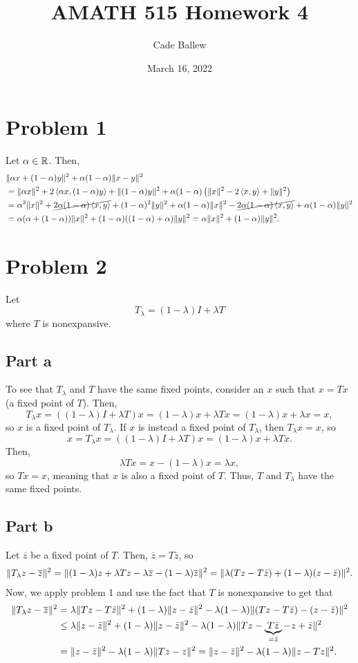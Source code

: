 \documentclass{article}
\title{AMATH 515 Homework 4}
\author{Cade Ballew}
\date{March 16, 2022}
\begin{document}
	
\maketitle
	
\section{Problem 1}
Let $\alpha\in\mathbb{R}$. Then,
\begin{align*}
&\|\alpha x + (1-\alpha) y\|^2 + \alpha(1-\alpha) \|x-y\|^2\\&=
\|\alpha x\|^2+2\left \langle \alpha x , (1-\alpha) y \right \rangle+\|(1-\alpha) y\|^2+ \alpha(1-\alpha)\left(\|x\|^2-2\left \langle x , y \right \rangle+\|y\|^2\right)\\&=
\alpha^2\|x\|^2+\cancel{2\alpha(1-\alpha)\left \langle x ,  y \right \rangle}+(1-\alpha)^2\| y\|^2+ \alpha(1-\alpha)\|x\|^2-\cancel{2\alpha(1-\alpha)\left \langle x , y \right \rangle}+\alpha(1-\alpha)\|y\|^2\\&=
\alpha(\alpha+(1-\alpha))\|x\|^2+(1-\alpha)((1-\alpha)+\alpha)\|y\|^2=\alpha \|x\|^2 + (1-\alpha) \|y\|^2.
\end{align*}

\section{Problem 2}
Let 
\[
T_\lambda = (1-\lambda)I + \lambda T
\]
where $T$ is nonexpansive. 
\subsection{Part a}
To see that $T_\lambda$ and $T$ have the same fixed points, consider an $x$ such that $x=Tx$ (a fixed point of $T$). Then,
\[
T_\lambda x=((1-\lambda)I + \lambda T)x=(1-\lambda)x+\lambda Tx=(1-\lambda)x+\lambda x=x,
\]
so $x$ is a fixed point of $T_\lambda$. If $x$ is instead a fixed point of $T_\lambda$, then $T_\lambda x=x$, so
\[
x=T_\lambda x=((1-\lambda)I + \lambda T)x=(1-\lambda)x+\lambda Tx.
\]
Then,
\[
\lambda Tx=x-(1-\lambda)x=\lambda x,
\]
so $Tx=x$, meaning that $x$ is also a fixed point of $T$. Thus, $T$ and $T_\lambda$ have the same fixed points.  

\subsection{Part b}
Let $\overline z$ be a fixed point of $T$. Then, $\overline z=T\overline z$, so
\begin{align*}
\|T_\lambda z - \overline z\|^2=\|(1-\lambda)z + \lambda Tz - \lambda\overline z -(1-\lambda)\overline z\|^2=\|\lambda (Tz-T\Bar{z})+(1-\lambda)(z-\Bar{z})\|^2.
\end{align*}
Now, we apply problem 1 and use the fact that $T$ is nonexpansive to get that 
\begin{align*}
\|T_\lambda z - \overline z\|^2&=\lambda\|Tz-T\Bar{z}\|^2+(1-\lambda)\|z-\Bar{z}\|^2-\lambda(1-\lambda)\|(Tz-T\Bar{z})-(z-\Bar{z})\|^2\\&\leq
\lambda\|z-\Bar{z}\|^2+(1-\lambda)\|z-\Bar{z}\|^2-\lambda(1-\lambda)\|Tz-\underbrace{T\Bar{z}}_{=\Bar{z}}-z+\Bar{z}\|^2\\&=
\|z-\Bar{z}\|^2-\lambda(1-\lambda)\|Tz-z\|^2=\|z-\Bar{z}\|^2-\lambda(1-\lambda)\|z-Tz\|^2.
\end{align*}
\end{document}
